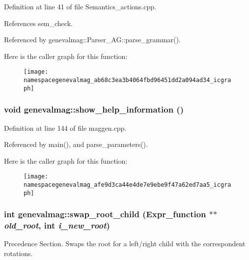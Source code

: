 Definition at line 41 of file Semantics\_\-actions.cpp.



References sem\_\-check.



Referenced by genevalmag::Parser\_\-AG::parse\_\-grammar().



Here is the caller graph for this function:\nopagebreak
\begin{figure}[H]
\begin{center}
\leavevmode
\texttt{[image: namespacegenevalmag\_ab68c3ea3b4064fbd96451dd2a094ad34\_icgraph]}
\end{center}
\end{figure}


\hypertarget{namespacegenevalmag_afe9d3ca44e4de7e9ebe9f47a62ed7aa5}{
\subsubsection[{show\_\-help\_\-information}]{\setlength{\rightskip}{0pt plus 5cm}void genevalmag::show\_\-help\_\-information ()}}
\label{namespacegenevalmag_afe9d3ca44e4de7e9ebe9f47a62ed7aa5}


Definition at line 144 of file maggen.cpp.



Referenced by main(), and parse\_\-parameters().



Here is the caller graph for this function:\nopagebreak
\begin{figure}[H]
\begin{center}
\leavevmode
\texttt{[image: namespacegenevalmag\_afe9d3ca44e4de7e9ebe9f47a62ed7aa5\_icgraph]}
\end{center}
\end{figure}


\hypertarget{namespacegenevalmag_a5132358a5088f64e976aa18643cff4d8}{
\subsubsection[{swap\_\-root\_\-child}]{\setlength{\rightskip}{0pt plus 5cm}int genevalmag::swap\_\-root\_\-child (Expr\_\-function $\ast$$\ast$ {\em old\_\-root}, \/  int {\em i\_\-new\_\-root})}}
\label{namespacegenevalmag_a5132358a5088f64e976aa18643cff4d8}
Precedence Section. Swaps the root for a left/right child with the correspondent rotations.

